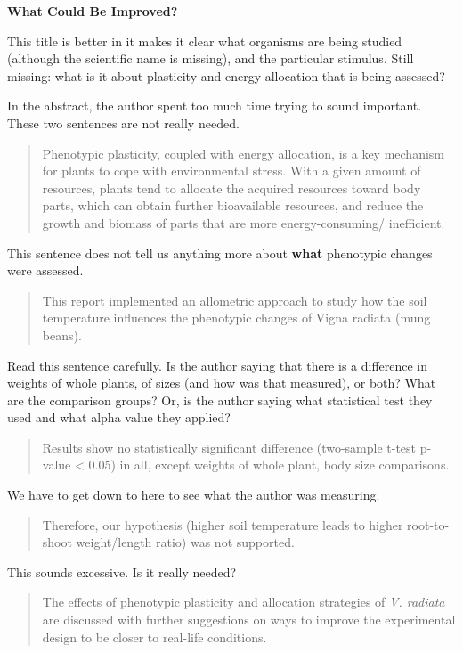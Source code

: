 \documentclass[
]{book}
\begin{document}
\textbf{What Could Be Improved?}

This title is better in it makes it clear what organisms are being studied (although the scientific name is missing), and the particular stimulus. Still missing: what is it about plasticity and energy allocation that is being assessed?

In the abstract, the author spent too much time trying to sound important. These two sentences are not really needed.

\begin{quote}
Phenotypic plasticity, coupled with energy allocation, is a key mechanism for plants to cope with environmental stress. With a given amount of resources, plants tend to allocate the acquired resources toward body parts, which can obtain further bioavailable resources, and reduce the growth and biomass of parts that are more energy-consuming/ inefficient.
\end{quote}

This sentence does not tell us anything more about \textbf{what} phenotypic changes were assessed.

\begin{quote}
This report implemented an allometric approach to study how the soil temperature influences the phenotypic changes of Vigna radiata (mung beans).
\end{quote}

Read this sentence carefully. Is the author saying that there is a difference in weights of whole plants, of sizes (and how was that measured), or both? What are the comparison groups? Or, is the author saying what statistical test they used and what alpha value they applied?

\begin{quote}
Results show no statistically significant difference (two-sample t-test p-value \textless{} 0.05) in all, except weights of whole plant, body size comparisons.
\end{quote}

We have to get down to here to see what the author was measuring.

\begin{quote}
Therefore, our hypothesis (higher soil temperature leads to higher root-to-shoot weight/length ratio) was not supported.
\end{quote}

This sounds excessive. Is it really needed?

\begin{quote}
The effects of phenotypic plasticity and allocation strategies of \emph{V. radiata} are discussed with further suggestions on ways to improve the experimental design to be closer to real-life conditions.
\end{quote}
\end{document}

